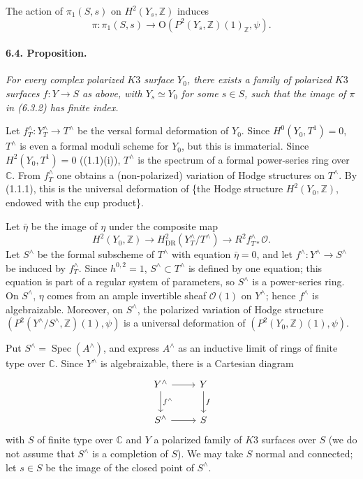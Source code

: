 \documentclass[10pt,leqno]{article}
\newcommand{\C}{\mathbb{C}}
\newcommand{\Z}{\mathbb{Z}}
\newcommand{\Spec}{\operatorname{Spec}}
\begin{document}
The action of $\pi_1(S,s)$ on $H^2(Y_s,\Z)$ induces
\[
\tag{6.3.2}
\pi:\pi_1(S,s)\longrightarrow \mathrm O(P^2(Y_s,\Z)(1)_\Z,\psi).
\]

\paragraph{6.4. Proposition.} \emph{For every complex polarized $K3$ surface $Y_0$, there exists a family of polarized $K3$ surfaces $f:Y\to S$ as above, with $Y_s\simeq Y_0$ for some $s\in S$, such that the image of $\pi$ in (6.3.2) has finite index.}

Let $f_T^\wedge:Y_T^\wedge\to T^\wedge$ be the versal formal deformation of $Y_0$. Since $H^0(Y_0,T^1)=0$, $T^\wedge$ is even a formal moduli scheme for $Y_0$, but this is immaterial. Since $H^2(Y_0,T^1)=0$ ((1.1)(i)), $T^\wedge$ is the spectrum of a formal power-series ring over $\C$. From $f_T^\wedge$ one obtains a (non-polarized) variation of Hodge structures on $T^\wedge$. By (1.1.1), this is the universal deformation of \{the Hodge structure $H^2(Y_0,\Z)$, endowed with the cup product\}.

Let $\bar\eta$ be the image of $\eta$ under the composite map
\[
H^2(Y_0,\Z)\longrightarrow H^2_{\mathrm{DR}}(Y_T^\wedge/T^\wedge)
\longrightarrow R^2f_{T*}^\wedge\mathcal O.
\]
Let $S^\wedge$ be the formal subscheme of $T^\wedge$ with equation $\bar\eta=0$, and let $f^\wedge:Y^\wedge\to S^\wedge$ be induced by $f_T^\wedge$. Since $h^{0,2}=1$, $S^\wedge\subset T^\wedge$ is defined by one equation; this equation is part of a regular system of parameters, so $S^\wedge$ is a power-series ring. On $S^\wedge$, $\eta$ comes from an ample invertible sheaf $\mathcal O(1)$ on $Y^\wedge$; hence $f^\wedge$ is algebraizable. Moreover, on $S^\wedge$, the polarized variation of Hodge structure $(P^2(Y^\wedge/S^\wedge,\Z)(1),\psi)$ is a universal deformation of $(P^2(Y_0,\Z)(1),\psi)$.

Put $S^\wedge=\Spec(A^\wedge)$, and express $A^\wedge$ as an inductive limit of rings of finite type over $\C$. Since $Y^\wedge$ is algebraizable, there is a Cartesian diagram
\[
\begin{tikzcd}[column sep=2.4em,row sep=2.2em]
Y^\wedge \arrow[r] \arrow[d,"f^\wedge"] & Y \arrow[d,"f"]\\
S^\wedge \arrow[r] & S
\end{tikzcd}
\]
with $S$ of finite type over $\C$ and $Y$ a polarized family of $K3$ surfaces over $S$ (we do not assume that $S^\wedge$ is a completion of $S$). We may take $S$ normal and connected; let $s\in S$ be the image of the closed point of $S^\wedge$.
\end{document}
